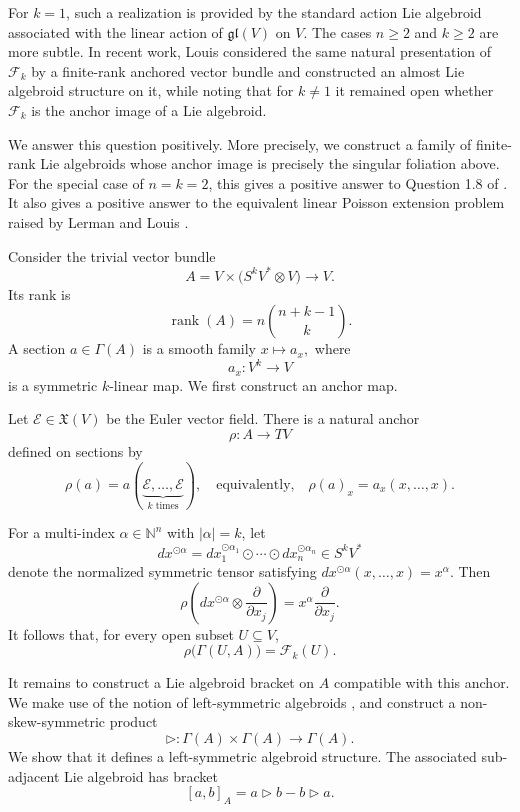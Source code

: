 \documentclass[12pt,reqno]{amsart}
\theoremstyle{definition}
\theoremstyle{remark}
\newcommand{\E}{\mathcal{E}}
\begin{document}
For \(k=1\), such a realization is provided by the standard action
Lie algebroid associated with the linear action of
\(\mathfrak{gl}(V)\) on \(V\). The cases \(n\geq 2\) and \(k\geq 2\)
are more subtle. In recent work, Louis \cite{Louis} considered the
same natural presentation of \(\mathcal F_k\) by a finite-rank
anchored vector bundle and constructed an almost Lie algebroid
structure on it, while noting that for \(k\neq 1\) it remained open whether $\mathcal{F}_k$ is the anchor image of a Lie algebroid.

We answer this question positively. More precisely, we construct a
family of finite-rank Lie algebroids whose anchor image is precisely
the singular foliation above. For the special case of \(n=k=2\), this
gives a positive answer to Question 1.8 of \cite{LGLR}. It also gives
a positive answer to the equivalent linear Poisson extension problem
raised by Lerman and Louis \cite{LL}.

Consider the trivial vector bundle
\[
A
=
V\times\bigl(S^kV^*\otimes V\bigr)
\longrightarrow V.
\]
Its rank is
\[
\operatorname{rank}(A)
=
n\binom{n+k-1}{k}.
\]
A section \(a\in\Gamma(A)\) is a smooth family
\(
x\longmapsto a_x,
\)
where
\[
a_x\colon V^k\longrightarrow V
\]
is a symmetric \(k\)-linear map. We first construct an anchor map.

Let \(\E\in\mathfrak X(V)\) be the Euler vector field. There is a natural
anchor
\[
\rho\colon A\longrightarrow TV
\]
defined on sections by
\[
\rho(a)
=
a(\underbrace{\E,\ldots,\E}_{k\text{ times}}),
\quad\text{equivalently,}\quad
\rho(a)_x=a_x(x,\ldots,x).
\]

For a multi-index \(\alpha\in\mathbb{N}^n\) with \(|\alpha|=k\), let
\[
dx^{\odot\alpha}
=
dx_1^{\odot\alpha_1}
\odot\cdots\odot
dx_n^{\odot\alpha_n}
\in S^kV^*
\]
denote the normalized symmetric tensor satisfying
\(
dx^{\odot\alpha}(x,\ldots,x)=x^\alpha.
\)
Then
\[
\rho\left(
dx^{\odot\alpha}\otimes
\frac{\partial}{\partial x_j}
\right)
=
x^\alpha\frac{\partial}{\partial x_j}.
\]
It follows that, for every open subset \(U\subseteq V\),
\[
\rho\bigl(\Gamma(U,A)\bigr)
=
\mathcal F_k(U).
\]

It remains to construct a Lie algebroid bracket on \(A\) compatible
with this anchor. We make use of the notion of left-symmetric
algebroids \cite{LSBC}, and construct a non-skew-symmetric product
\[
\triangleright\colon
\Gamma(A)\times\Gamma(A)
\longrightarrow\Gamma(A).
\]
We show that it defines a left-symmetric algebroid structure. The
associated sub-adjacent Lie algebroid has bracket
\[
[a,b]_A
=
a\triangleright b-b\triangleright a.
\]
\end{document}
